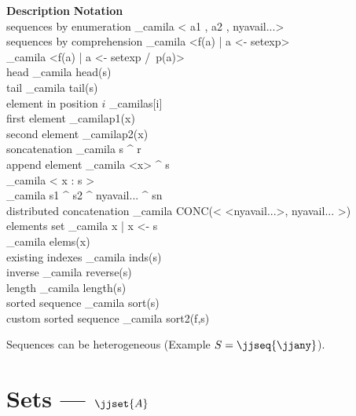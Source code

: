 \documentclass[english,a4paper]{article}
\begin{document}
\begin{framed}
\noindent \textbf{Description}  \hfill  \textbf{Notation} \ \  \\
 sequences by enumeration     \dotfill \_camila{ < a1 , a2 , nyavail{...}> } \\
 sequences by comprehension   \dotfill \_camila{ <f(a)  | a <- setexp>} \\
      \mbox{}                   \hfill \_camila{ <f(a)  | a <- setexp /\ p(a)>} \\
 head                         \dotfill \_camila{ head(s)}  \\
 tail                         \dotfill \_camila{ tail(s)} \\
 element in position $i$      \dotfill \_camila{s[i]} \\
 first element                \dotfill \_camila{p1(x) } \\
 second element               \dotfill \_camila{p2(x) } \\
 soncatenation                \dotfill \_camila{ s ^ r} \\
 append element               \dotfill \_camila{  <x> ^ s} \\
                        \mbox{} \hfill \_camila{ < x : s > } \\
                        \mbox{} \hfill \_camila{ s1 ^ s2 ^ nyavail{...} ^ sn } \\
 distributed concatenation    \dotfill \_camila{ CONC(< <nyavail{...}>, nyavail{...} >) } \\
 elements set                 \dotfill \_camila{  { x | x <- s } } \\
                        \mbox{} \hfill \_camila{  elems(x) } \\
 existing indexes             \dotfill \_camila{ inds(s) } \\
 inverse                      \dotfill \_camila{  reverse(s) } \\
 length                       \dotfill \_camila{  length(s) } \\
 sorted sequence              \dotfill \_camila{  sort(s)  } \\
 custom sorted sequence       \dotfill \_camila{  sort2(f,s)}
\end{framed}

Sequences can be heterogeneous (Example $S=\jjseq{\jjany}$).


\section{Sets --- $\jjset{A}$}
\end{document}
